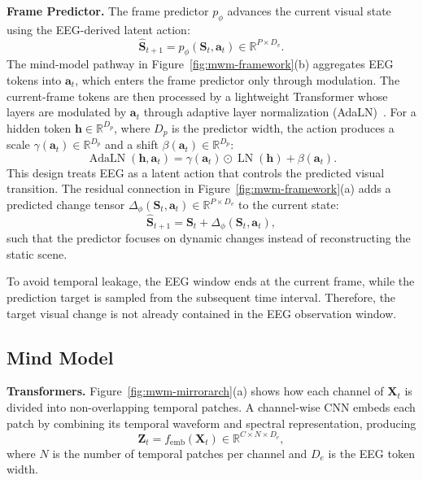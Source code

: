 \noindent\textbf{Frame Predictor.}
The frame predictor $p_{\phi}$ advances the current visual state using the EEG-derived latent action:
\begin{equation}
    \hat{\mathbf{S}}_{t+1}
    =
    p_{\phi}(\mathbf{S}_t,\mathbf{a}_t)\in\mathbb{R}^{P\times D_v}.
\end{equation}
The mind-model pathway in Figure~\ref{fig:mwm-framework}(b) aggregates EEG tokens into $\mathbf{a}_t$, which enters the frame predictor only through modulation. The current-frame tokens are then processed by a lightweight Transformer whose layers are modulated by $\mathbf{a}_t$ through adaptive layer normalization (AdaLN)~\citep{peebles2023scalable}. For a hidden token $\mathbf{h}\in\mathbb{R}^{D_p}$, where $D_p$ is the predictor width, the action produces a scale $\gamma(\mathbf{a}_t)\in\mathbb{R}^{D_p}$ and a shift $\beta(\mathbf{a}_t)\in\mathbb{R}^{D_p}$:
\begin{equation}
    \operatorname{AdaLN}(\mathbf{h},\mathbf{a}_t)
    =
    \gamma(\mathbf{a}_t)\odot
    \operatorname{LN}(\mathbf{h})
    +
    \beta(\mathbf{a}_t).
\end{equation}
This design treats EEG as a latent action that controls the predicted visual transition. The residual connection in Figure~\ref{fig:mwm-framework}(a) adds a predicted change tensor $\Delta_{\phi}(\mathbf{S}_t,\mathbf{a}_t)\in\mathbb{R}^{P\times D_v}$ to the current state:
\begin{equation}
    \hat{\mathbf{S}}_{t+1}
    =
    \mathbf{S}_t+\Delta_{\phi}(\mathbf{S}_t,\mathbf{a}_t),
\end{equation}
such that the predictor focuses on dynamic changes instead of reconstructing the static scene.

To avoid temporal leakage, the EEG window ends at the current frame, while the prediction target is sampled from the subsequent time interval. Therefore, the target visual change is not already contained in the EEG observation window.

\subsection{Mind Model}
\label{sec:mwm-mind-model}

\noindent\textbf{Transformers.}
Figure~\ref{fig:mwm-mirrorarch}(a) shows how each channel of $\mathbf{X}_t$ is divided into non-overlapping temporal patches. A channel-wise CNN embeds each patch by combining its temporal waveform and spectral representation, producing
\begin{equation}
    \mathbf{Z}_t
    =
    f_{\mathrm{emb}}(\mathbf{X}_t)
    \in\mathbb{R}^{C\times N\times D_e},
\end{equation}
where $N$ is the number of temporal patches per channel and $D_e$ is the EEG token width.

